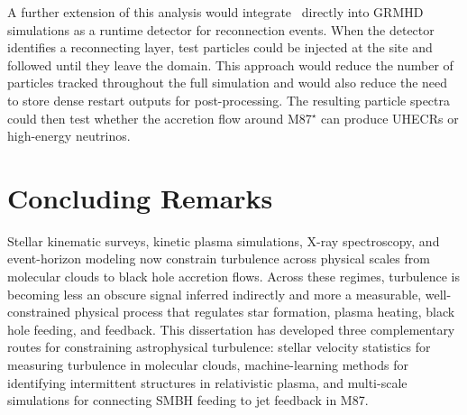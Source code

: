 A further extension of this analysis would integrate \awesom\ directly into GRMHD simulations as a runtime detector for reconnection events.
When the detector identifies a reconnecting layer, test particles could be injected at the site and followed until they leave the domain.
This approach would reduce the number of particles tracked throughout the full simulation and would also reduce the need to store dense restart outputs for post-processing.
The resulting particle spectra could then test whether the accretion flow around M87$^{\star}$ can produce UHECRs or high-energy neutrinos.

\section{Concluding Remarks}

Stellar kinematic surveys, kinetic plasma simulations, X-ray spectroscopy, and event-horizon modeling now constrain turbulence across physical scales from molecular clouds to black hole accretion flows.
Across these regimes, turbulence is becoming less an obscure signal inferred indirectly and more a measurable, well-constrained physical process that regulates star formation, plasma heating, black hole feeding, and feedback.
This dissertation has developed three complementary routes for constraining astrophysical turbulence: stellar velocity statistics for measuring turbulence in molecular clouds, machine-learning methods for identifying intermittent structures in relativistic plasma, and multi-scale simulations for connecting SMBH feeding to jet feedback in M87.
